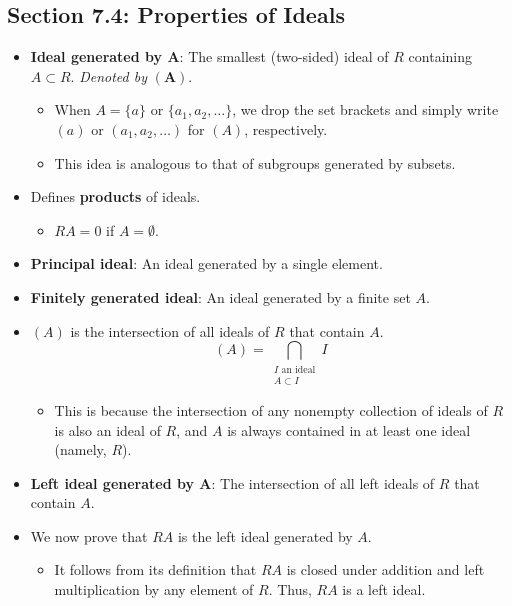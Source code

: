 \documentclass[../notes.tex]{subfiles}
\begin{document}
\subsection*{Section 7.4: Properties of Ideals}
\begin{itemize}
    \item {}\textbf{Ideal generated by $\bm{A}$}: The smallest (two-sided) ideal of $R$ containing $A\subset R$. \emph{Denoted by} $\bm{(A)}$.
    \begin{itemize}
        \item When $A=\{a\}$ or $\{a_1,a_2,\dots\}$, we drop the set brackets and simply write $(a)$ or $(a_1,a_2,\dots)$ for $(A)$, respectively.
        \item This idea is analogous to that of subgroups generated by subsets.
    \end{itemize}
    \item Defines \textbf{products} of ideals.
    \begin{itemize}
        \item $RA=0$ if $A=\emptyset$.
    \end{itemize}
    \item \textbf{Principal ideal}: An ideal generated by a single element.
    \item \textbf{Finitely generated ideal}: An ideal generated by a finite set $A$.
    \item $(A)$ is the intersection of all ideals of $R$ that contain $A$.
    \begin{equation*}
        (A) = \bigcap_{\substack{I\text{ an ideal}\\A\subset I}}I
    \end{equation*}
    \begin{itemize}
        \item This is because the intersection of any nonempty collection of ideals of $R$ is also an ideal of $R$, and $A$ is always contained in at least one ideal (namely, $R$).
    \end{itemize}
    \item \textbf{Left ideal generated by $\bm{A}$}: The intersection of all left ideals of $R$ that contain $A$.
    \item We now prove that $RA$ is the left ideal generated by $A$.
    \begin{itemize}
        \item It follows from its definition that $RA$ is closed under addition and left multiplication by any element of $R$. Thus, $RA$ is a left ideal.

\end{itemize}
\end{itemize}
\end{document}
